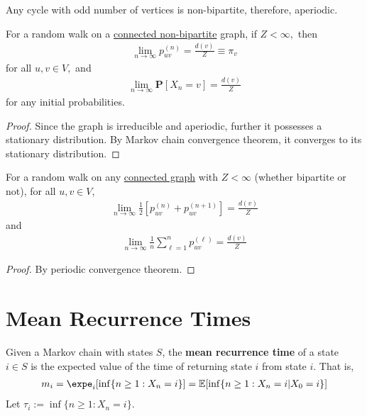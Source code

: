 \documentclass{article}
\begin{document}
	\begin{proposition}
		Any cycle with odd number of vertices is non-bipartite, therefore, aperiodic.
	\end{proposition}
	
	\begin{theorem}
		For a random walk on a \ul{connected non-bipartite} graph, if $Z<\infty,$ then 
		\begin{align}
			\lim _{n \rightarrow \infty} p_{u v}^{(n)}=\frac{d(v)}{Z} \equiv \pi_v	
		\end{align}
		for all $u, v \in V,$ and 
		\begin{align}
			\lim _{n \rightarrow \infty} \mathbf{P}\left[X_{n}=v\right]=\frac{d(v)}{Z}
		\end{align}
		for any initial probabilities.
	\end{theorem}
	\begin{proof}
		Since the graph is irreducible and aperiodic, further it possesses a stationary distribution. By Markov chain convergence theorem, it converges to its stationary distribution.
	\end{proof}
	
	\begin{theorem}
		For a random walk on any \ul{connected graph} with $Z<\infty$ (whether bipartite or not), for all $u, v \in V$,
		\begin{align}
			\lim _{n \rightarrow \infty} \frac{1}{2}\left[p_{u v}^{(n)}+p_{u v}^{(n+1)}\right]=\frac{d(v)}{Z}	
		\end{align}
		and
		\begin{align}
			\lim _{n \rightarrow \infty} \frac{1}{n} \sum_{\ell=1}^{n} p_{u v}^{(\ell)}=\frac{d(v)}{Z}
		\end{align}
	\end{theorem}
	
	\begin{proof}
		By periodic convergence theorem.
	\end{proof}
	
	\section{Mean Recurrence Times}
	\begin{definition}
		Given a Markov chain with states $S$, the \textbf{mean recurrence time} of a state $i \in S$ is the expected value of the time of returning state $i$ from state $i$. That is,
		\begin{align}
			m_i = \expe_i[\inf\{n \geq 1: X_n = i\}] = \expect{\inf\{n \geq 1: X_n = i | X_0 = i\}}
		\end{align}
		Let $\tau_i := \inf\{n \geq 1: X_n = i\}$.
	\end{definition}
	
\end{document}
